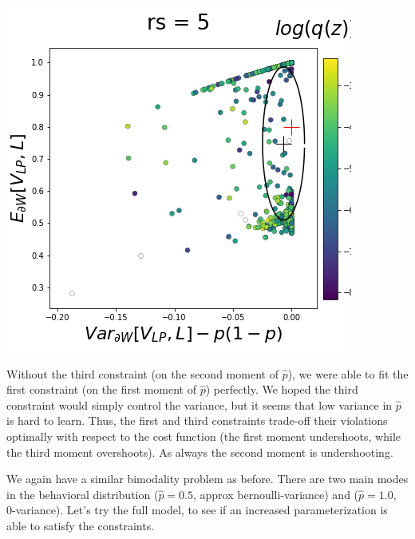 \documentclass[11pt]{article}
\begin{document}
\begin{center}
\includegraphics[scale=0.33]{figs/T_x_SC_pvar_reduced_c=0_p=80_rs=5.png}
\end{center}

Without the third constraint (on the second moment of $\hat{p}$), we were able to fit the first constraint (on the first moment of $\hat{p}$) perfectly.  We hoped the third constraint would simply control the variance, but it seems that low variance in $\hat{p}$ is hard to learn.  Thus, the first and third constraints trade-off their violations optimally with respect to the cost function (the first moment undershoots, while the third moment overshoots).  As always the second moment is undershooting.

We again have a similar bimodality problem as before.  There are two main modes in the behavioral distribution ($\hat{p} = 0.5$, approx bernoulli-variance) and ($\hat{p} = 1.0$, 0-variance).   Let's try the full model, to see if an increased parameterization is able to satisfy the constraints.
\end{document}
